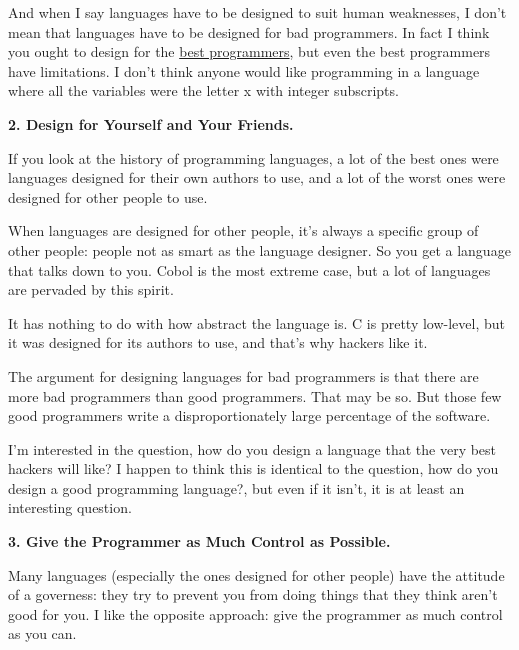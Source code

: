 And when I
                    say languages have to be designed to suit human weaknesses,
                    I don't mean that languages have to be designed for bad
                    programmers. In fact I think you ought to design for the
                    \href{http://www.paulgraham.com/design.html}{best programmers}, but even the
                    best programmers have limitations. I don't think anyone
                    would like programming in a language where all the variables
                    were the letter x with integer subscripts.

\textbf{2. Design for Yourself and Your Friends.}

If you look at the history of programming
                    languages, a lot of the best ones were languages designed
                    for their own authors to use, and a lot of the worst ones
                    were designed for other people to use.

When
                    languages are designed for other people, it's always a
                    specific group of other people: people not as smart as the
                    language designer. So you get a language that talks down to
                    you. Cobol is the most extreme case, but a lot of languages
                    are pervaded by this spirit.

It has nothing to do
                    with how abstract the language is. C is pretty low-level,
                    but it was designed for its authors to use, and that's why
                    hackers like it.

The argument for designing
                    languages for bad programmers is that there are more bad
                    programmers than good programmers. That may be so. But those
                    few good programmers write a disproportionately large
                    percentage of the software.

I'm interested in the
                    question, how do you design a language that the very best
                    hackers will like? I happen to think this is identical to
                    the question, how do you design a good programming
                    language?, but even if it isn't, it is at least an
                    interesting question.

\textbf{3. Give the Programmer as Much Control as Possible.}

Many languages (especially the ones designed
                    for other people) have the attitude of a governess: they try
                    to prevent you from doing things that they think aren't good
                    for you. I like the opposite approach: give the programmer
                    as much control as you can.


